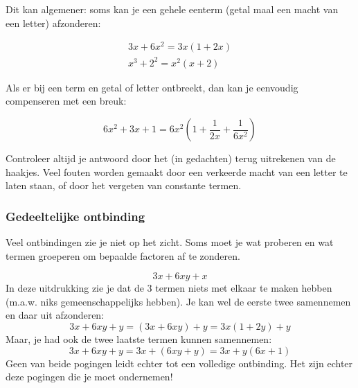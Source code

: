 Dit kan algemener: soms kan je een gehele eenterm (getal maal een macht van een letter) afzonderen:

\begin{voorbeeld}
	\begin{eqnarray*}
		3x+6x^2=3x(1+2x) \\
		x^3+2^2=x^2(x+2)
	\end{eqnarray*}
\end{voorbeeld}

Als er bij een term en getal of letter ontbreekt, dan kan je eenvoudig compenseren met een breuk:

\begin{voorbeeld}
	\begin{equation*}
	6x^2+3x+1=6x^2(1+\frac{1}{2x}+\frac{1}{6x^2})
	\end{equation*}
\end{voorbeeld}

Controleer altijd je antwoord door het (in gedachten) terug uitrekenen van de haakjes. Veel fouten worden gemaakt door een verkeerde macht van een letter te laten staan, of door het vergeten van constante termen.

\subsubsection{Gedeeltelijke ontbinding}
Veel ontbindingen zie je niet op het zicht. Soms moet je wat proberen en wat termen groeperen om bepaalde factoren af te zonderen. 
\begin{voorbeeld}
	
\begin{equation*}
3x+6xy+x
\end{equation*}
In deze uitdrukking zie je dat de 3 termen niets met elkaar te maken hebben (m.a.w. niks gemeenschappelijks hebben). Je kan wel de eerste twee samennemen en daar  uit afzonderen:
\begin{equation*}
3x+6xy+y = (3x+6xy)+y = 3x(1+2y)+y
\end{equation*}
Maar, je had ook de twee laatste termen kunnen samennemen:
\begin{equation*}
3x+6xy+y = 3x+(6xy+y) = 3x+y(6x+1)
\end{equation*}
Geen van beide pogingen leidt echter tot een volledige ontbinding. Het zijn echter deze pogingen die je moet ondernemen!

\end{voorbeeld}
